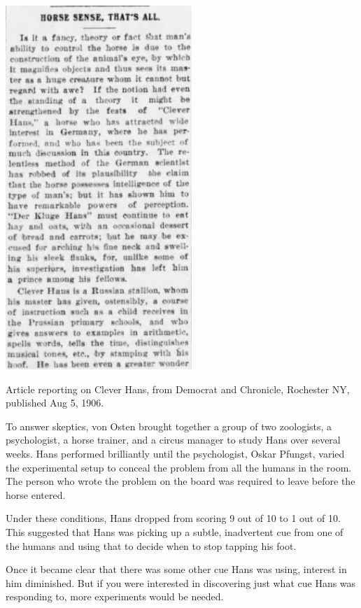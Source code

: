 \begin{refsection}
\begin{marginfigure}
\begin{center}\includegraphics{../images/cleverhansarticle.png}\end{center}
\caption{Article reporting on Clever Hans, from Democrat and Chronicle, Rochester NY, published Aug 5, 1906.}
\label{fig:cleverhansarticle}
\end{marginfigure}To answer skeptics, von Osten brought together a group of two zoologists, a psychologist, a horse trainer, and a circus manager to study Hans over several weeks. Hans performed brilliantly until the psychologist, Oskar Pfungst, varied the experimental setup to conceal the problem from all the humans in the room. The person who wrote the problem on the board was required to leave before the horse entered. 

Under these conditions, Hans dropped from scoring 9 out of 10 to 1 out of 10. This suggested that Hans was picking up a subtle, inadvertent cue from one of the humans and using that to decide when to stop tapping his foot.

Once it became clear that there was some other cue Hans was using, interest in him diminished. But if you were interested in discovering just what cue Hans was responding to, more experiments would be needed. 


\end{refsection}
